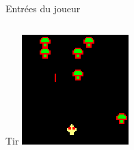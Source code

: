 \begin{frame}{Entrées du joueur}
\begin{columns}
\begin{column}{0.4\textwidth}
\begin{block}{Tir}
				\smallskip
				\includegraphics[width=\textwidth]{imgs/tirEtDeplacement.png}
			\end{block}
		\end{column}
	\end{columns}
\end{frame}
